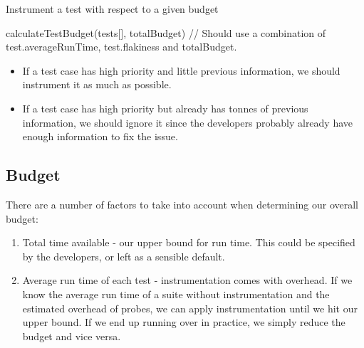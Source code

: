\begin{algorithm}
\caption{Instrument a test with respect to a given budget}
\label{alg4}
\begin{algorithmic}
		\ELSE
		\ENDIF
	\ENDFOR
\end{algorithmic}
\end{algorithm}

calculateTestBudget(tests[], totalBudget) {
	// Should use a combination of test.averageRunTime, test.flakiness and totalBudget.
}

\begin{itemize}
	\item If a test case has high priority and little previous information, we should instrument it as much as possible.
	\item If a test case has high priority but already has tonnes of previous information, we should ignore it since the developers probably already have enough information to fix the issue.
\end{itemize}

\subsection{Budget}

There are a number of factors to take into account when determining our overall budget:

\begin{enumerate}
	\item Total time available - our upper bound for run time. This could be specified by the developers, or left as a sensible default.
	\item Average run time of each test - instrumentation comes with overhead. If we know the average run time of a suite without instrumentation and the estimated overhead of probes, we can apply instrumentation until we hit our upper bound. If we end up running over in practice, we simply reduce the budget and vice versa.
\end{enumerate}


